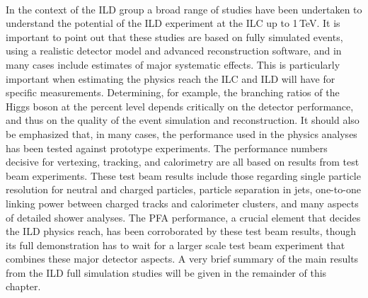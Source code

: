 \\

In the context of the ILD group a broad range of studies have been undertaken to understand the potential of the ILD experiment at the ILC up to 1\,TeV. 
It is important to point out that these studies are based on fully simulated events, using a realistic detector model and advanced reconstruction software, and in many cases include estimates of major systematic effects. This is particularly important when estimating the physics reach the ILC and ILD will have for specific measurements. Determining, for example, the branching ratios of the Higgs boson at the percent level depends critically on the detector performance, and thus on the quality of the event simulation and reconstruction.
It should also be emphasized that, in many cases, the performance used in the physics analyses has been tested against prototype experiments. The performance numbers decisive for vertexing, tracking, and calorimetry are all based on results from test beam experiments. These test beam results include those regarding single particle resolution for neutral and charged particles, particle separation in jets, one-to-one linking power between charged tracks and calorimeter clusters, and many aspects of detailed shower analyses. The PFA performance, a crucial element that decides the ILD physics reach, has been corroborated by these test beam results, though its full demonstration has to wait for a larger scale test beam experiment that combines these major detector aspects. 
A very brief summary of the main results from the ILD full simulation studies will be given in the remainder of this chapter.
\\

